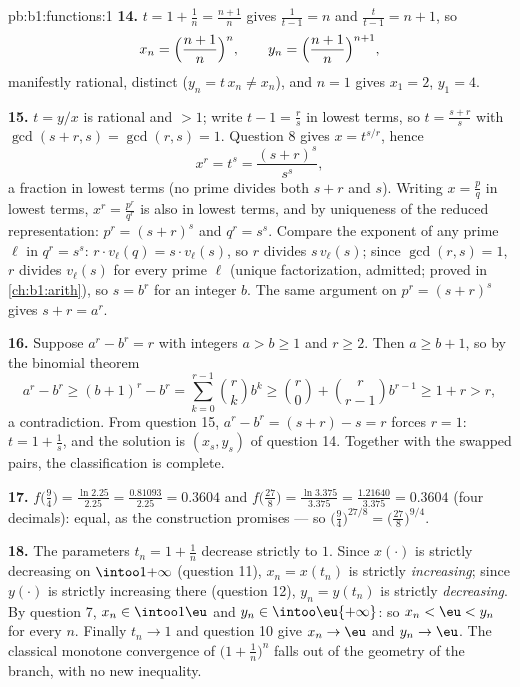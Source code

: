 \begin{solution}{pb:b1:functions:1}
\textbf{14.} $t = 1 + \frac1n = \frac{n+1}n$ gives $\frac1{t - 1}
= n$ and $\frac t{t-1} = n + 1$, so
\[
x_n = \Bigl(\frac{n+1}n\Bigr)^{n},
\qquad
y_n = \Bigl(\frac{n+1}n\Bigr)^{n+1},
\]
manifestly rational, distinct ($y_n = t\,x_n \neq x_n$), and $n =
1$ gives $x_1 = 2$, $y_1 = 4$.

\textbf{15.} $t = y/x$ is rational and $> 1$; write $t - 1 =
\frac rs$ in lowest terms, so $t = \frac{s + r}s$ with $\gcd(s +
r, s) = \gcd(r, s) = 1$. Question 8 gives $x = t^{s/r}$, hence
\[
x^r = t^s = \frac{(s+r)^s}{s^s} ,
\]
a fraction in lowest terms (no prime divides both $s + r$ and
$s$). Writing $x = \frac pq$ in lowest terms, $x^r = \frac{p^r}
{q^r}$ is also in lowest terms, and by uniqueness of the reduced
representation: $p^r = (s+r)^s$ and $q^r = s^s$. Compare the
exponent of any prime $\ell$ in $q^r = s^s$: $r \cdot
v_\ell(q) = s \cdot v_\ell(s)$, so $r$ divides $s\,v_\ell(s)$;
since $\gcd(r, s) = 1$, $r$ divides $v_\ell(s)$ for every prime
$\ell$ (unique factorization, admitted; proved in
\cref{ch:b1:arith}), so $s = b^r$ for an integer $b$. The same
argument on $p^r = (s+r)^s$ gives $s + r = a^r$.

\textbf{16.} Suppose $a^r - b^r = r$ with integers $a > b \geq 1$
and $r \geq 2$. Then $a \geq b + 1$, so by the binomial theorem
\[
a^r - b^r \geq (b+1)^r - b^r
= \sum_{k=0}^{r-1}\binom rk b^k
\geq \binom r0 + \binom r{r-1} b^{r-1}
\geq 1 + r > r ,
\]
a contradiction. From question 15, $a^r - b^r = (s + r) - s = r$
forces $r = 1$: $t = 1 + \frac1s$, and the solution is $(x_s,
y_s)$ of question 14. Together with the swapped pairs, the
classification is complete.

\textbf{17.} $f\bigl(\tfrac94\bigr) = \frac{\ln 2.25}{2.25} =
\frac{0.81093}{2.25} = 0.3604$ and $f\bigl(\tfrac{27}8\bigr) =
\frac{\ln 3.375}{3.375} = \frac{1.21640}{3.375} = 0.3604$ (four
decimals): equal, as the construction promises --- so
$\bigl(\tfrac94\bigr)^{27/8} = \bigl(\tfrac{27}8\bigr)^{9/4}$.

\textbf{18.} The parameters $t_n = 1 + \frac1n$ decrease strictly
to $1$. Since $x(\cdot)$ is strictly decreasing on
$\intoo1{+\infty}$ (question 11), $x_n = x(t_n)$ is strictly
\emph{increasing}; since $y(\cdot)$ is strictly increasing there
(question 12), $y_n = y(t_n)$ is strictly \emph{decreasing}. By
question 7, $x_n \in \intoo1\eu$ and $y_n \in
\intoo\eu{+\infty}$: so $x_n < \eu < y_n$ for every $n$. Finally
$t_n \to 1$ and question 10 give $x_n \to \eu$ and $y_n \to \eu$.
The classical monotone convergence of $\bigl(1 +
\frac1n\bigr)^n$ falls out of the geometry of the branch, with no
new inequality.


\end{solution}
